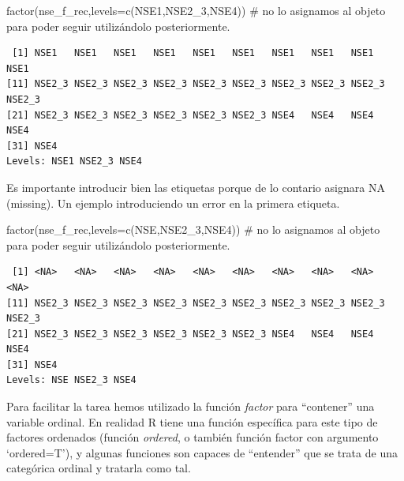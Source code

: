 \documentclass[
  letterpaper,
  DIV=11,
  numbers=noendperiod]{scrreprt}
\newenvironment{Shaded}{\begin{snugshade}}{\end{snugshade}}
\newcommand{\AttributeTok}[1]{\textcolor[rgb]{0.40,0.45,0.13}{#1}}
\newcommand{\CommentTok}[1]{\textcolor[rgb]{0.37,0.37,0.37}{#1}}
\newcommand{\FunctionTok}[1]{\textcolor[rgb]{0.28,0.35,0.67}{#1}}
\newcommand{\NormalTok}[1]{\textcolor[rgb]{0.00,0.23,0.31}{#1}}
\newcommand{\StringTok}[1]{\textcolor[rgb]{0.13,0.47,0.30}{#1}}
\begin{document}
\begin{Shaded}
\begin{Highlighting}[]
\FunctionTok{factor}\NormalTok{(nse\_f\_rec,}\AttributeTok{levels=}\FunctionTok{c}\NormalTok{(}\StringTok{\textquotesingle{}NSE1\textquotesingle{}}\NormalTok{,}\StringTok{\textquotesingle{}NSE2\_3\textquotesingle{}}\NormalTok{,}\StringTok{\textquotesingle{}NSE4\textquotesingle{}}\NormalTok{)) }\CommentTok{\# no lo asignamos al objeto para poder seguir utilizándolo posteriormente.}
\end{Highlighting}
\end{Shaded}

\begin{verbatim}
 [1] NSE1   NSE1   NSE1   NSE1   NSE1   NSE1   NSE1   NSE1   NSE1   NSE1  
[11] NSE2_3 NSE2_3 NSE2_3 NSE2_3 NSE2_3 NSE2_3 NSE2_3 NSE2_3 NSE2_3 NSE2_3
[21] NSE2_3 NSE2_3 NSE2_3 NSE2_3 NSE2_3 NSE2_3 NSE4   NSE4   NSE4   NSE4  
[31] NSE4  
Levels: NSE1 NSE2_3 NSE4
\end{verbatim}

Es importante introducir bien las etiquetas porque de lo contario
asignara NA (missing). Un ejemplo introduciendo un error en la primera
etiqueta.

\begin{Shaded}
\begin{Highlighting}[]
\FunctionTok{factor}\NormalTok{(nse\_f\_rec,}\AttributeTok{levels=}\FunctionTok{c}\NormalTok{(}\StringTok{\textquotesingle{}NSE\textquotesingle{}}\NormalTok{,}\StringTok{\textquotesingle{}NSE2\_3\textquotesingle{}}\NormalTok{,}\StringTok{\textquotesingle{}NSE4\textquotesingle{}}\NormalTok{)) }\CommentTok{\# no lo asignamos al objeto para poder seguir utilizándolo posteriormente.}
\end{Highlighting}
\end{Shaded}

\begin{verbatim}
 [1] <NA>   <NA>   <NA>   <NA>   <NA>   <NA>   <NA>   <NA>   <NA>   <NA>  
[11] NSE2_3 NSE2_3 NSE2_3 NSE2_3 NSE2_3 NSE2_3 NSE2_3 NSE2_3 NSE2_3 NSE2_3
[21] NSE2_3 NSE2_3 NSE2_3 NSE2_3 NSE2_3 NSE2_3 NSE4   NSE4   NSE4   NSE4  
[31] NSE4  
Levels: NSE NSE2_3 NSE4
\end{verbatim}

Para facilitar la tarea hemos utilizado la función \emph{factor} para
``contener'' una variable ordinal. En realidad R tiene una función
específica para este tipo de factores ordenados (función \emph{ordered},
o también función factor con argumento `ordered=T'), y algunas funciones
son capaces de ``entender'' que se trata de una categórica ordinal y
tratarla como tal.
\end{document}
